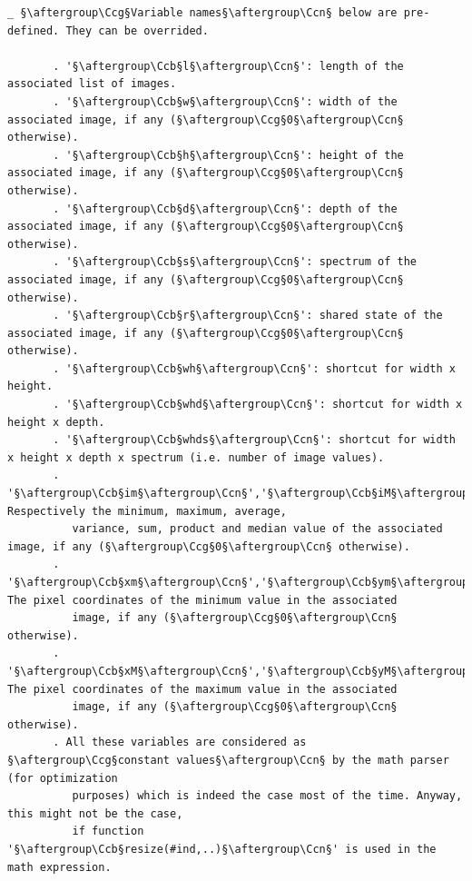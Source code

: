 \documentclass[a4paper,10.5pt,twoside]{book}
\def\Ccb{\color{cb}}
\def\Ccg{\color{cc}}
\def\Ccn{\color{black}}
\begin{document}
\begin{lstlisting}[escapechar=§]
    _ §\aftergroup\Ccg§Variable names§\aftergroup\Ccn§ below are pre-defined. They can be overrided. 
 
       . '§\aftergroup\Ccb§l§\aftergroup\Ccn§': length of the associated list of images. 
       . '§\aftergroup\Ccb§w§\aftergroup\Ccn§': width of the associated image, if any (§\aftergroup\Ccg§0§\aftergroup\Ccn§ otherwise). 
       . '§\aftergroup\Ccb§h§\aftergroup\Ccn§': height of the associated image, if any (§\aftergroup\Ccg§0§\aftergroup\Ccn§ otherwise). 
       . '§\aftergroup\Ccb§d§\aftergroup\Ccn§': depth of the associated image, if any (§\aftergroup\Ccg§0§\aftergroup\Ccn§ otherwise). 
       . '§\aftergroup\Ccb§s§\aftergroup\Ccn§': spectrum of the associated image, if any (§\aftergroup\Ccg§0§\aftergroup\Ccn§ otherwise). 
       . '§\aftergroup\Ccb§r§\aftergroup\Ccn§': shared state of the associated image, if any (§\aftergroup\Ccg§0§\aftergroup\Ccn§ otherwise). 
       . '§\aftergroup\Ccb§wh§\aftergroup\Ccn§': shortcut for width x height. 
       . '§\aftergroup\Ccb§whd§\aftergroup\Ccn§': shortcut for width x height x depth. 
       . '§\aftergroup\Ccb§whds§\aftergroup\Ccn§': shortcut for width x height x depth x spectrum (i.e. number of image values). 
       . '§\aftergroup\Ccb§im§\aftergroup\Ccn§','§\aftergroup\Ccb§iM§\aftergroup\Ccn§','§\aftergroup\Ccb§ia§\aftergroup\Ccn§','§\aftergroup\Ccb§iv§\aftergroup\Ccn§','§\aftergroup\Ccb§is§\aftergroup\Ccn§','§\aftergroup\Ccb§ip§\aftergroup\Ccn§','§\aftergroup\Ccb§ic§\aftergroup\Ccn§': Respectively the minimum, maximum, average, 
          variance, sum, product and median value of the associated image, if any (§\aftergroup\Ccg§0§\aftergroup\Ccn§ otherwise). 
       . '§\aftergroup\Ccb§xm§\aftergroup\Ccn§','§\aftergroup\Ccb§ym§\aftergroup\Ccn§','§\aftergroup\Ccb§zm§\aftergroup\Ccn§','§\aftergroup\Ccb§cm§\aftergroup\Ccn§': The pixel coordinates of the minimum value in the associated 
          image, if any (§\aftergroup\Ccg§0§\aftergroup\Ccn§ otherwise). 
       . '§\aftergroup\Ccb§xM§\aftergroup\Ccn§','§\aftergroup\Ccb§yM§\aftergroup\Ccn§','§\aftergroup\Ccb§zM§\aftergroup\Ccn§','§\aftergroup\Ccb§cM§\aftergroup\Ccn§': The pixel coordinates of the maximum value in the associated 
          image, if any (§\aftergroup\Ccg§0§\aftergroup\Ccn§ otherwise). 
       . All these variables are considered as §\aftergroup\Ccg§constant values§\aftergroup\Ccn§ by the math parser (for optimization 
          purposes) which is indeed the case most of the time. Anyway, this might not be the case, 
          if function '§\aftergroup\Ccb§resize(#ind,..)§\aftergroup\Ccn§' is used in the math expression. 

\end{lstlisting}
\end{document}

